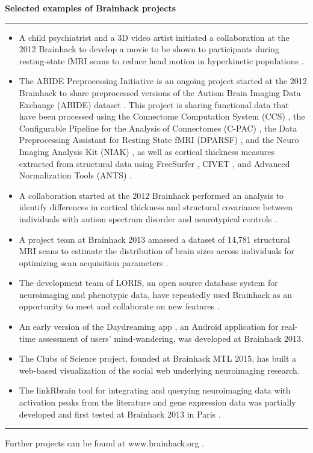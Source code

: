 \begin{table}[!ht]
\caption{{\bf Selected examples of Brainhack projects}\label{tab3}}
\hrule %
    \begin{itemize}
    \item 
        A child psychiatrist and a 3D video artist initiated a collaboration at the 2012 Brainhack to develop a movie to be shown to participants during resting-state fMRI scans to reduce head motion in hyperkinetic populations \cite{inscapes, vanderwal2015}.
    \item 
        The ABIDE Preprocessing Initiative \cite{abide_preproc} is an ongoing project started at the 2012 Brainhack to share preprocessed versions of the Autism Brain Imaging Data Exchange (ABIDE) dataset \cite{abide, dimartino2014}. This project is sharing functional data that have been processed using the Connectome Computation System (CCS) \cite{ccs, Xu2015}, the Configurable Pipeline for the Analysis of Connectomes (C-PAC) \cite{cpac, craddock2013}, the Data Preprocessing Assistant for Resting State fMRI (DPARSF) \cite{dparsf, yan2010}, and the Neuro Imaging Analysis Kit (NIAK) \cite{niak, bellec2011}, as well as cortical thickness measures extracted from structural data using FreeSurfer \cite{freesurfer, fischl2000}, CIVET \cite{civet, zijdenbos2002}, and Advanced Normalization Tools (ANTS) \cite{ants, tustison2014}.
    \item
        A collaboration started at the 2012 Brainhack performed an analysis to identify differences in cortical thickness and structural covariance between individuals with autism spectrum disorder and neurotypical controls \cite{Valk2015}.
    \item
        A project team at Brainhack 2013 amassed a dataset of 14,781 structural MRI scans to estimate the distribution of brain sizes across individuals for optimizing scan acquisition parameters \cite{Mennes2014}.
    \item 
        The development team of LORIS, an open source database system for neuroimaging and phenotypic data, have repeatedly used Brainhack as an opportunity to meet and collaborate on new features \cite{Das2012}.
    \item
        An early version of the Daydreaming app \cite{dayapp}, an Android application for real-time assessment of users' mind-wandering, was developed at Brainhack 2013.
    \item 
        The Clubs of Science \cite{clubs} project, founded at Brainhack MTL 2015, has built a web-based visualization of the social web underlying neuroimaging research.
    \item
        The linkRbrain \cite{linkrbrain} tool for integrating and querying neuroimaging data with activation peaks from the literature and gene expression data  was partially developed and first tested at Brainhack 2013 in Paris \cite{Mesmoudi2015}. 
    \end{itemize}
\hrule %
\smallskip Further projects can be found at www.brainhack.org \cite{brainhackorg}.
\end{table}

